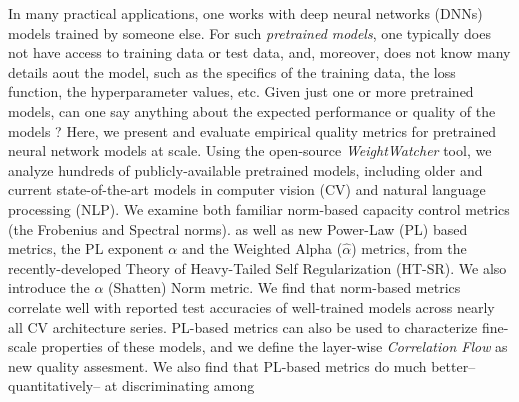 
In many practical applications, one works with deep neural networks (DNNs) models trained by someone else.
For such \emph{pretrained models}, one typically does not have access to training data or test data, 
and, moreover,  does not know many details aout the  model, such as
the specifics of the training data, the loss function, the hyperparameter values, etc.
Given just one or more pretrained models, can one say anything about the expected performance or quality of the models ?
Here, we present and evaluate empirical quality metrics for pretrained neural network models at scale.
%
Using the open-source \emph{WeightWatcher} tool, we analyze hundreds of publicly-available pretrained models, including older and current state-of-the-art models in computer vision (CV) and natural language processing (NLP).
We examine both familiar norm-based capacity control metrics (the Frobenius and  Spectral norms). as well as
new Power-Law (PL) based metrics, the PL exponent $\alpha$ and the Weighted Alpha ($\hat{\alpha}$) metrics,
from the recently-developed Theory of Heavy-Tailed Self Regularization (HT-SR).
We also introduce the $\alpha$ (Shatten) Norm metric.
We find that norm-based metrics correlate well with reported test accuracies of well-trained models
across nearly all CV architecture series.
PL-based metrics can also be used to characterize fine-scale properties of these models, and
we define the layer-wise \emph{Correlation Flow} as new quality assesment.
We also find that PL-based metrics do much better--quantitatively-- at discriminating among
